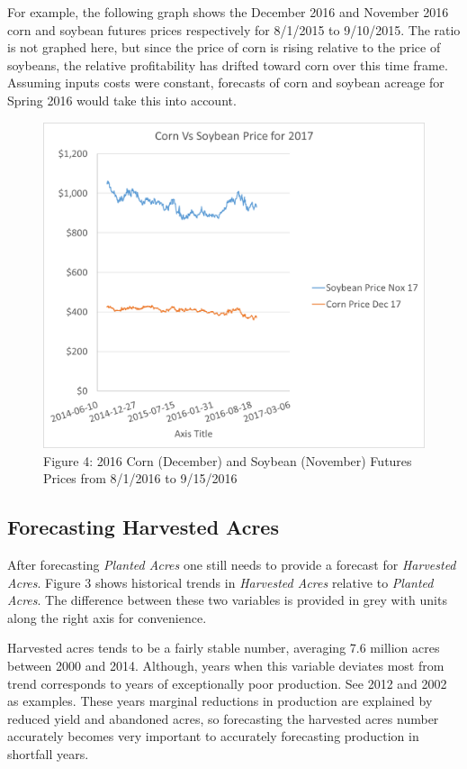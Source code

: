 \documentclass[]{book}
\theoremstyle{definition}
\theoremstyle{definition}
\theoremstyle{remark}
\begin{document}
For example, the following graph shows the December 2016 and November
2016 corn and soybean futures prices respectively for 8/1/2015 to
9/10/2015. The ratio is not graphed here, but since the price of corn is
rising relative to the price of soybeans, the relative profitability has
drifted toward corn over this time frame. Assuming inputs costs were
constant, forecasts of corn and soybean acreage for Spring 2016 would
take this into account.

\begin{figure}[htbp]
\centering
\includegraphics{images/c-s2017.png}
\caption{Figure 4: 2016 Corn (December) and Soybean (November) Futures
Prices from 8/1/2016 to 9/15/2016}
\end{figure}

\subsection{Forecasting Harvested
Acres}\label{forecasting-harvested-acres}

After forecasting \emph{Planted Acres} one still needs to provide a
forecast for \emph{Harvested Acres}. Figure 3 shows historical trends in
\emph{Harvested Acres} relative to \emph{Planted Acres}. The difference
between these two variables is provided in grey with units along the
right axis for convenience.

Harvested acres tends to be a fairly stable number, averaging 7.6
million acres between 2000 and 2014. Although, years when this variable
deviates most from trend corresponds to years of exceptionally poor
production. See 2012 and 2002 as examples. These years marginal
reductions in production are explained by reduced yield and abandoned
acres, so forecasting the harvested acres number accurately becomes very
important to accurately forecasting production in shortfall years.
\end{document}
